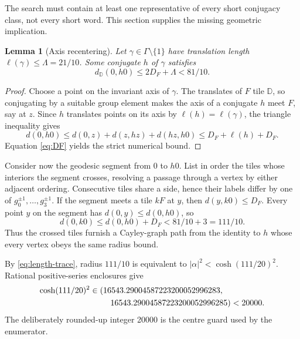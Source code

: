 \documentclass[11pt,a4paper]{article}
\newtheorem{lemma}[theorem]{Lemma}
\theoremstyle{definition}
\newcommand{\D}{\mathbb D}
\newcommand{\length}{\ell}
\begin{document}
The search must contain at least one representative of every short
conjugacy class, not every short word.  This section supplies the missing
geometric implication.

\begin{lemma}[Axis recentering]\label{lem:recenter}
Let \(\gamma\in\Gamma\setminus\{1\}\) have translation length
\(\length(\gamma)\leq\Lambda=21/10\).  Some conjugate \(h\) of \(\gamma\)
satisfies
\[
 d_{\D}(0,h0)\leq2D_F+\Lambda<81/10.
\]
\end{lemma}

\begin{proof}
Choose a point on the invariant axis of \(\gamma\).  The translates of \(F\)
tile \(\D\), so conjugating by a suitable group element makes the axis of a
conjugate \(h\) meet \(F\), say at \(z\).  Since \(h\) translates points on its
axis by \(\length(h)=\length(\gamma)\), the triangle inequality gives
\[
 d(0,h0)\leq d(0,z)+d(z,hz)+d(hz,h0)
 \leq D_F+\length(h)+D_F.
\]
Equation \eqref{eq:DF} yields the strict numerical bound.
\end{proof}

Consider now the geodesic segment from \(0\) to \(h0\).  List in order the
tiles whose interiors the segment crosses, resolving a passage through a
vertex by either adjacent ordering.  Consecutive tiles share a side, hence
their labels differ by one of
\(g_0^{\pm1},\ldots,g_3^{\pm1}\).  If the segment meets a tile \(kF\) at
\(y\), then \(d(y,k0)\leq D_F\).  Every point \(y\) on the segment has
\(d(0,y)\leq d(0,h0)\), so
\begin{equation}\label{eq:chain-radius}
 d(0,k0)\leq d(0,h0)+D_F<81/10+3=111/10.
\end{equation}
Thus the crossed tiles furnish a Cayley-graph path from the identity to \(h\)
whose every vertex obeys the same radius bound.

By \eqref{eq:length-trace}, radius \(111/10\) is equivalent to
\(|\alpha|^2<\cosh(111/20)^2\).  Rational positive-series enclosures give
\begin{equation}\label{eq:guard}
\begin{aligned}
 \cosh(111/20)^2
 &\in(16543.29004587223200052996283,\\
 &\hspace{2.5em}16543.29004587223200052996285)<20000.
\end{aligned}
\end{equation}
The deliberately rounded-up integer 20000 is the centre guard used by the
enumerator.
\end{document}
